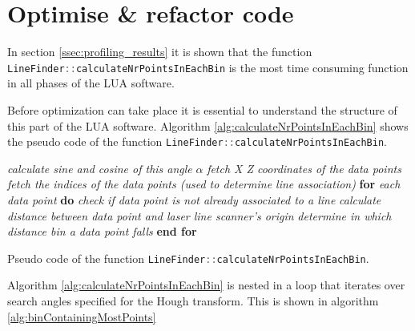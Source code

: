 \section{Optimise \& refactor code} \label{sec:optimize}
In section \ref{ssec:profiling_results} it is shown that the function \lstinline[language=c]|LineFinder::calculateNrPointsInEachBin| is the most time consuming function in all phases of the LUA software.

Before optimization can take place it is essential to understand the structure of this part of the LUA software. Algorithm \ref{alg:calculateNrPointsInEachBin} shows the pseudo code of the function \lstinline[language=c]|LineFinder::calculateNrPointsInEachBin|.

\begin{algorithm}
    \begin{algorithmic}[1]
        \State \textit{calculate sine and cosine of this angle} $\alpha$
        \State \textit{fetch X Z coordinates of the data points}
        \State \textit{fetch the indices of the data points (used to determine line association)}
        \State \textbf{for} \textit{each data point} \textbf{do}
        \State \hspace{1cm} \textit{check if data point is not already associated to a line}
        \State \hspace{1cm} \textit{calculate distance between data point and laser line scanner's origin}
        \State \hspace{1cm} \textit{determine in which distance bin a data point falls}
        \State \textbf{end for}
        \EndFunction
    \end{algorithmic}
    \caption{Pseudo code of the function \lstinline[language=c]|LineFinder::calculateNrPointsInEachBin|.}
    \label{alg:calculateNrPointsInEachBin}
\end{algorithm}

Algorithm \ref{alg:calculateNrPointsInEachBin} is nested in a loop that iterates over search angles specified for the Hough transform. This is shown in algorithm \ref{alg:binContainingMostPoints}

